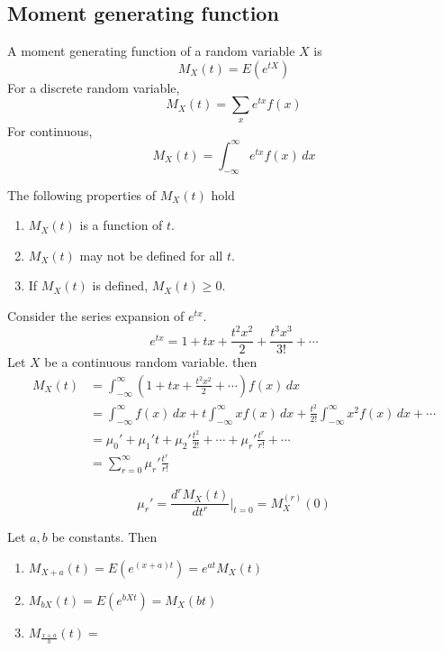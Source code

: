 \documentclass[11pt]{article}
\begin{document}
\subsection{Moment generating function}
\begin{definition}
    A moment generating function of a random variable $X$ is 
    \[
        M_X(t) = E(e^{tX})
    \]
    For a discrete random variable,
    \[
        M_X(t) = \sum_{x} e^{tx} f(x)
    \]
    For continuous,
    \[
        M_X(t) = \int_{-\infty}^{\infty} e^{tx}f(x)\, dx
    \]
\end{definition}
\begin{remark} The following properties of $M_X(t)$ hold
    \begin{enumerate}
        \item $M_X(t)$ is a function of $t$.
        \item $M_X(t)$ may not be defined for all $t$.
        \item If $M_X(t)$ is defined, $M_X(t) \ge 0$.
    \end{enumerate}
\end{remark}
Consider the series expansion of $e^{tx}$.
\[
    e^{tx} = 1+tx+\frac{t^2x^2}{2}+\frac{t^3x^3}{3!} + \cdots
\]
Let $X$ be a continuous random variable. then
\begin{align*}
    M_X(t) &= \int_{-\infty}^{\infty} (1+tx+\frac{t^2x^2}{2} + \cdots)f(x)\, dx\\
    &= \int_{-\infty}^{\infty} f(x)\, dx + t\int_{-\infty}^{\infty} xf(x)\, dx + \frac{t^2}{2!}\int_{-\infty}^{\infty}x^2 f(x)\, dx + \cdots \\
    &= \mu_0' + \mu_1't+\mu_2' \frac{t^2}{2!}+\cdots + \mu_r' \frac{t^r}{r!}+\cdots\\
    &= \sum_{r=0}^{\infty} \mu_r' \frac{t^r}{r!}   
\end{align*}
\begin{theorem}
    \[
        \mu_r' = \frac{d^r M_X(t)}{dt^r}|_{t=0} = M_X^{(r)}(0)
    \]
\end{theorem}
\begin{theorem}
    Let $a, b$ be constants. Then 
    \begin{enumerate}
        \item $M_{X+a}(t) = E(e^{(x+a)t}) = e^{at}M_X(t)$
        \item $M_{bX}(t) = E(e^{bXt}) = M_X(bt)$
        \item $M_{\frac{x+a}{b}}(t) = $
    \end{enumerate}
    
\end{theorem}
\end{document}
